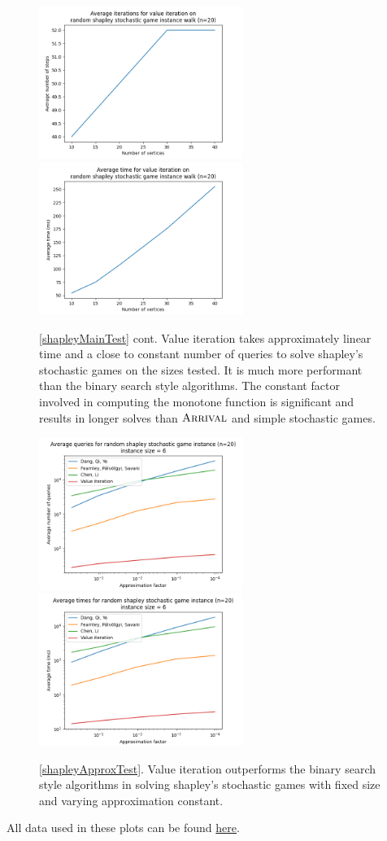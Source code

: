   \vspace{-20pt}
  \begin{figure}[H]
      \centering
      \includegraphics[width=2.6in]{plots/shapley_iterations.png}
      \centering
      \includegraphics[width=2.6in]{plots/shapley_iter_time.png}
      \caption{\cref{shapleyMainTest} cont. Value iteration takes approximately linear time
      and a close to constant number of queries to solve shapley's stochastic games on the sizes tested.
      It is much more performant than the binary search style algorithms. The constant factor involved in
      computing the monotone function is significant and results in longer solves than $\textsc{Arrival}$ and simple stochastic games.} \label{shapleyWalkPlot}
  \end{figure}
  \vspace{-20pt}
  \begin{figure}[H]
      \centering
      \includegraphics[width=2.6in]{plots/shapley_eps_queries.png}
      \centering
      \includegraphics[width=2.6in]{plots/shapley_eps_times.png}
      \caption{\cref{shapleyApproxTest}. Value iteration outperforms the binary search style algorithms in solving
      shapley's stochastic games with fixed size and varying approximation constant.} \label{shapleyApproxPlot}
  \end{figure}
  All data used in these plots can be found \href{https://github.com/angusjoshi/tarski/blob/main/src/analysis/makePlots.py}{here}.
